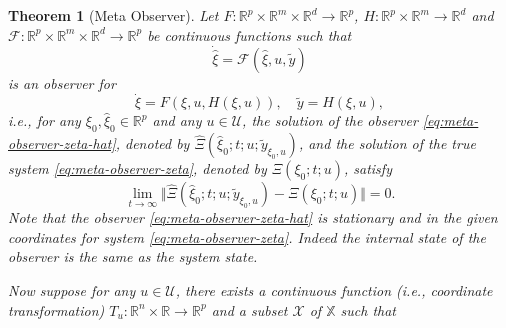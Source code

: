 \documentclass[
]{book}
\newtheorem{theorem}{Theorem}[chapter]
\theoremstyle{definition}
\theoremstyle{definition}
\theoremstyle{definition}
\theoremstyle{definition}
\theoremstyle{remark}
\begin{document}
\begin{theorem}[Meta Observer]
\protect\hypertarget{thm:observerdesignmeta}{}\label{thm:observerdesignmeta}Let \(F: \mathbb{R}^p \times \mathbb{R}^m \times \mathbb{R}^d \rightarrow \mathbb{R}^p\), \(H: \mathbb{R}^p \times \mathbb{R}^m \rightarrow \mathbb{R}^d\) and \(\mathcal{F}: \mathbb{R}^p \times \mathbb{R}^m \times \mathbb{R}^d \rightarrow \mathbb{R}^p\) be continuous functions such that
\begin{equation}
\dot{\hat{\xi}} = \mathcal{F}(\hat{\xi}, u, \tilde{y})
\label{eq:meta-observer-zeta-hat}
\end{equation}
is an observer for
\begin{equation}
\dot{\xi} = F(\xi,u,H(\xi,u)), \quad \tilde{y} = H(\xi,u),
\label{eq:meta-observer-zeta}
\end{equation}
i.e., for any \(\xi_0,\hat{\xi}_0 \in \mathbb{R}^p\) and any \(u \in \mathcal{U}\), the solution of the observer \eqref{eq:meta-observer-zeta-hat},
denoted by \(\hat{\Xi}(\hat{\xi}_0;t;u;\tilde{y}_{\xi_0,u})\), and the solution of the true system \eqref{eq:meta-observer-zeta}, denoted by \(\Xi(\xi_0;t;u)\), satisfy
\begin{equation}
\lim_{t \rightarrow \infty} \Vert \hat{\Xi}(\hat{\xi}_0;t;u;\tilde{y}_{\xi_0,u}) - \Xi(\xi_0;t;u) \Vert = 0.
\label{eq:meta-observer-zeta-converge}
\end{equation}
Note that the observer \eqref{eq:meta-observer-zeta-hat} is stationary and in the given coordinates for system \eqref{eq:meta-observer-zeta}. Indeed the internal state of the observer is the same as the system state.

Now suppose for any \(u \in \mathcal{U}\), there exists a continuous function (i.e., coordinate transformation) \(T_u: \mathbb{R}^n \times \mathbb{R} \rightarrow \mathbb{R}^p\) and a subset \(\mathcal{X}\) of \(\mathbb{X}\) such that


\end{theorem}
\end{document}
